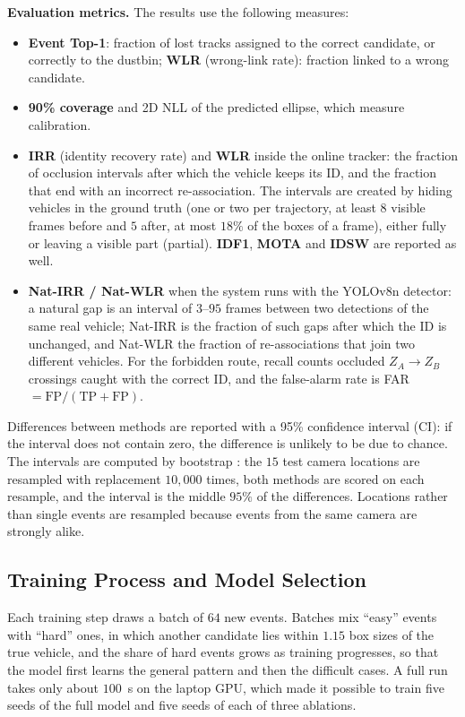 \textbf{Evaluation metrics.} The results use the following measures:
\begin{itemize}
    \item \textbf{Event Top-1}: fraction of lost tracks assigned to the correct candidate, or correctly to the dustbin; \textbf{WLR} (wrong-link rate): fraction linked to a wrong candidate.
    \item \textbf{90\% coverage} and 2D NLL of the predicted ellipse, which measure calibration.
    \item \textbf{IRR} (identity recovery rate) and \textbf{WLR} inside the online tracker: the fraction of occlusion intervals after which the vehicle keeps its ID, and the fraction that end with an incorrect re-association. The intervals are created by hiding vehicles in the ground truth (one or two per trajectory, at least $8$ visible frames before and $5$ after, at most $18\%$ of the boxes of a frame), either fully or leaving a visible part (partial). \textbf{IDF1}, \textbf{MOTA} and \textbf{IDSW} are reported as well.
    \item \textbf{Nat-IRR / Nat-WLR} when the system runs with the YOLOv8n detector: a natural gap is an interval of $3$--$95$ frames between two detections of the same real vehicle; Nat-IRR is the fraction of such gaps after which the ID is unchanged, and Nat-WLR the fraction of re-associations that join two different vehicles. For the forbidden route, recall counts occluded $Z_A\!\to\!Z_B$ crossings caught with the correct ID, and the false-alarm rate is FAR $= \text{FP}/(\text{TP}+\text{FP})$.
\end{itemize}
Differences between methods are reported with a 95\% confidence interval (CI): if the interval does not contain zero, the difference is unlikely to be due to chance. The intervals are computed by bootstrap \cite{efron1994bootstrap}: the $15$ test camera locations are resampled with replacement $10{,}000$ times, both methods are scored on each resample, and the interval is the middle $95\%$ of the differences. Locations rather than single events are resampled because events from the same camera are strongly alike.

\subsection{Training Process and Model Selection}
\label{sec:training_process}

Each training step draws a batch of $64$ new events. Batches mix ``easy'' events with ``hard'' ones, in which another candidate lies within $1.15$ box sizes of the true vehicle, and the share of hard events grows as training progresses, so that the model first learns the general pattern and then the difficult cases. A full run takes only about $100$~s on the laptop GPU, which made it possible to train five seeds of the full model and five seeds of each of three ablations.

